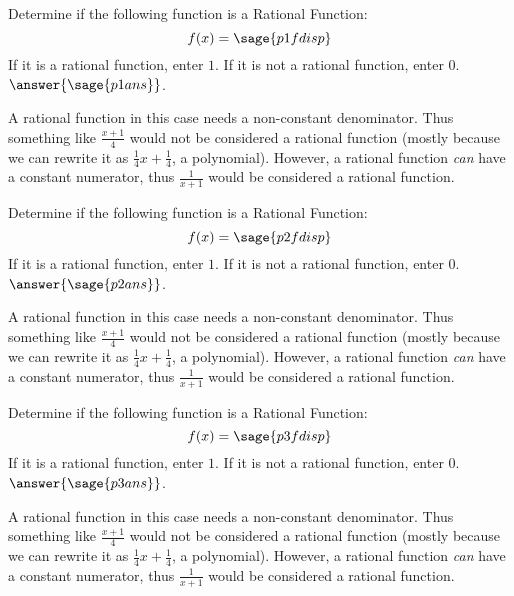 \documentclass{ximera}
\begin{document}
\begin{problem}
    Determine if the following function is a Rational Function:
    \[
        f(x) = \sage{p1fdisp}
    \]
    If it is a rational function, enter $1$. If it is not a rational function, enter $0$. $\answer{\sage{p1ans}}$.
    
    \begin{feedback}
        A rational function in this case needs a non-constant denominator. Thus something like $\frac{x+1}{4}$ would not be considered a rational function (mostly because we can rewrite it as $\frac{1}{4}x + \frac{1}{4}$, a polynomial). However, a rational function \textit{can} have a constant numerator, thus $\frac{1}{x+1}$ would be considered a rational function.
    \end{feedback}
\end{problem}



\begin{problem}
    Determine if the following function is a Rational Function:
    \[
        f(x) = \sage{p2fdisp}
    \]
    If it is a rational function, enter $1$. If it is not a rational function, enter $0$. $\answer{\sage{p2ans}}$.
    
    \begin{feedback}
        A rational function in this case needs a non-constant denominator. Thus something like $\frac{x+1}{4}$ would not be considered a rational function (mostly because we can rewrite it as $\frac{1}{4}x + \frac{1}{4}$, a polynomial). However, a rational function \textit{can} have a constant numerator, thus $\frac{1}{x+1}$ would be considered a rational function.
    \end{feedback}
\end{problem}



\begin{problem}
    Determine if the following function is a Rational Function:
    \[
        f(x) = \sage{p3fdisp}
    \]
    If it is a rational function, enter $1$. If it is not a rational function, enter $0$. $\answer{\sage{p3ans}}$.
    
    \begin{feedback}
        A rational function in this case needs a non-constant denominator. Thus something like $\frac{x+1}{4}$ would not be considered a rational function (mostly because we can rewrite it as $\frac{1}{4}x + \frac{1}{4}$, a polynomial). However, a rational function \textit{can} have a constant numerator, thus $\frac{1}{x+1}$ would be considered a rational function.
    \end{feedback}
\end{problem}
\end{document}
